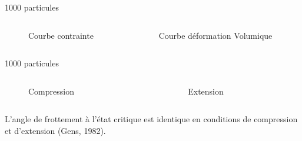 \documentclass[10pt]{beamer}
\begin{document}
\begin{frame}{1000 particules}
    \begin{columns}
        \begin{column}{0.5\textwidth}
            \begin{figure}
                \centering
                \scalebox{0.5}{}
                \caption{Courbe contrainte}
            \end{figure}
        \end{column}
        \begin{column}{0.5\textwidth}
            \begin{figure}
                \centering
                \scalebox{0.5}{}
                \caption{Courbe déformation Volumique}
            \end{figure}
        \end{column}
    \end{columns}
\end{frame}

\begin{frame}{1000 particules}
    \begin{columns}
        \begin{column}{0.5\textwidth}
            \begin{figure}
                \centering
                \scalebox{0.5}{}
                \caption{Compression}
            \end{figure}
        \end{column}
        \begin{column}{0.5\textwidth}
            \begin{figure}
                \centering
                \scalebox{0.5}{}
                \caption{Extension}
            \end{figure}
        \end{column}
    \end{columns}
    L’angle de frottement à l’état critique est identique en conditions de compression et d’extension (Gens, 1982).
\end{frame}
\end{document}
